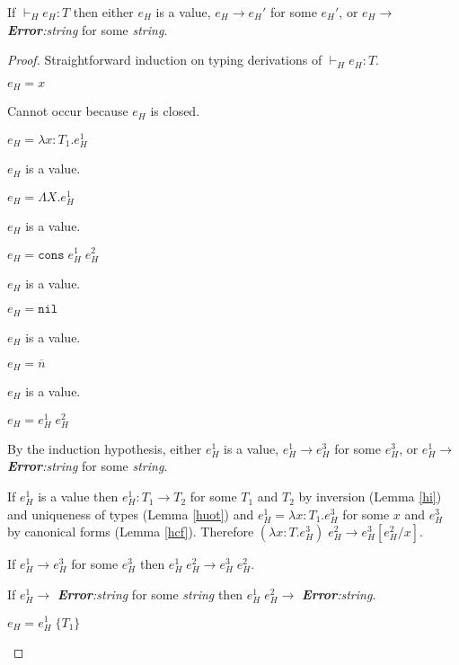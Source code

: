\begin{hps}
\label{hps}
If $\vdash_{H}e_{H}:T$ then either $e_{H}$ is a value, $e_{H}\rightarrow e_{H}'$ for some $e_{H}'$, or $e_{H}\rightarrow$ \emph{\textbf{Error}:\;string} for some \emph{string}.



\begin{proof}
Straightforward induction on typing derivations of $\vdash_{H}e_{H}:T$.
\begin{hps-case-1}
$e_{H}=x$

Cannot occur because $e_{H}$ is closed.
\end{hps-case-1}
\begin{hps-case-2}
$e_{H}=\lambda x:T_{1}.e_{H}^{1}$

$e_{H}$ is a value.
\end{hps-case-2}
\begin{hps-case-3}
$e_{H}=\Lambda X.e_{H}^{1}$

$e_{H}$ is a value.
\end{hps-case-3}
\begin{hps-case-4}
$e_{H}=\mathtt{cons}\;e_{H}^{1}\;e_{H}^{2}$

$e_{H}$ is a value.
\end{hps-case-4}
\begin{hps-case-5}
$e_{H}=\mathtt{nil}$

$e_{H}$ is a value.
\end{hps-case-5}
\begin{hps-case-6}
$e_{H}=\overline{n}$

$e_{H}$ is a value.
\end{hps-case-6}
\begin{hps-case-7}
$e_{H}=e_{H}^{1}\;e_{H}^{2}$

By the induction hypothesis, either $e_{H}^{1}$ is a value, $e_{H}^{1}\rightarrow e_{H}^{3}$ for some $e_{H}^{3}$, or $e_{H}^{1}\rightarrow$ \emph{\textbf{Error}:\;string} for some \emph{string}.

If $e_{H}^{1}$ is a value then $e_{H}^{1}:T_{1}\rightarrow T_{2}$ for some $T_{1}$ and $T_{2}$ by inversion (Lemma \ref{hi}) and uniqueness of types (Lemma \ref{huot}) and $e_{H}^{1}=\lambda x:T_{1}.e_{H}^{3}$ for some $x$ and $e_{H}^{3}$ by canonical forms (Lemma \ref{hcf}).  Therefore $(\lambda x:T.e_{H}^{3})\;e_{H}^{2}\rightarrow e_{H}^{3}[e_{H}^{2}/x]$.

If $e_{H}^{1}\rightarrow e_{H}^{3}$ for some $e_{H}^{3}$ then $e_{H}^{1}\;e_{H}^{2}\rightarrow e_{H}^{3}\;e_{H}^{2}$.

If $e_{H}^{1}\rightarrow$ \emph{\textbf{Error}:\;string} for some \emph{string} then $e_{H}^{1}\;e_{H}^{2}\rightarrow$ \emph{\textbf{Error}:\;string}.
\end{hps-case-7}
\begin{hps-case-8}
$e_{H}=e_{H}^{1}\;\lbrace T_{1}\rbrace$


\end{hps-case-8}
\end{proof}
\end{hps}
